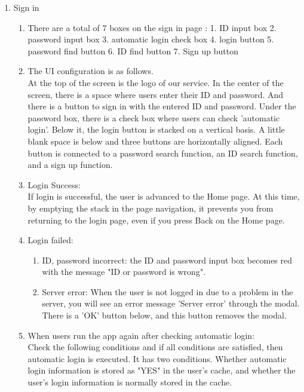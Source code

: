 \documentclass[11pt, conference]{IEEEtran}
\begin{document}
\begin{enumerate}[label=\arabic*]
    \item {\large{Sign in}}
    \begin{enumerate}[label=\alph*]
        \item There are a total of 7 boxes on the sign in page : 1. ID input box 2. password input box 3. automatic login check box 4. login button 5. password find button 6. ID find button 7. Sign up button
        \item The UI configuration is as follows.\\
        At the top of the screen is the logo of our service. In the center of the screen, there is a space where users enter their ID and password. And there is a button to sign in with the entered ID and password. Under the password box, there is a check box where users can check 'automatic login'. Below it, the login button is stacked on a vertical basis. A little blank space is below and three buttons are horizontally aligned. Each button is connected to a password search function, an ID search function, and a sign up function.
        \item Login Success: \\
        If login is successful, the user is advanced to the Home page. At this time, by emptying the stack in the page navigation, it prevents you from returning to the login page, even if you press Back on the Home page.
        \item Login failed:
        \begin{enumerate}
            \item ID, password incorrect: the ID and password input box becomes red with the message "ID or password is wrong".
            \item Server error: When the user is not logged in due to a problem in the server, you will see an error message 'Server error' through the modal. There is a 'OK' button below, and this button removes the modal. 
        \end{enumerate}
        \item When users run the app again after checking automatic login: \\
        Check the following conditions and if all conditions are satisfied, then automatic login is executed. It has two conditions. Whether automatic login information is stored as "YES" in the user's cache, and whether the user's login information is normally stored in the cache.\\
    \end{enumerate}
    

\end{enumerate}
\end{document}
